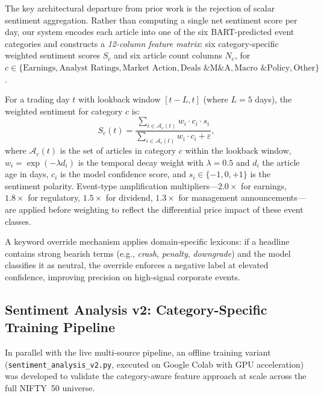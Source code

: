 \documentclass[ASNA,twocolumn]{USG}
\begin{document}
The key architectural departure from prior work is the rejection of scalar
sentiment aggregation. Rather than computing a single net sentiment score per
day, our system encodes each article into one of the six BART-predicted event
categories and constructs a \emph{12-column feature matrix}:
six category-specific weighted sentiment scores $S_c$ and six article count
columns $N_c$, for $c \in \{\text{Earnings}, \text{Analyst Ratings},
\text{Market Action}, \text{Deals \& M\&A}, \text{Macro \& Policy}, \text{Other}\}$.

For a trading day $t$ with lookback window $[t - L, t]$ (where $L = 5$ days),
the weighted sentiment for category $c$ is:
\begin{equation}
  S_c(t) = \frac{\sum_{i \in \mathcal{A}_c(t)} w_i \cdot c_i \cdot s_i}
                {\sum_{i \in \mathcal{A}_c(t)} w_i \cdot c_i + \varepsilon},
  \label{eq:cat_sent}
\end{equation}
where $\mathcal{A}_c(t)$ is the set of articles in category $c$ within the
lookback window, $w_i = \exp(-\lambda d_i)$ is the temporal decay weight
with $\lambda = 0.5$ and $d_i$ the article age in days,
$c_i$ is the model confidence score, and $s_i \in \{-1, 0, +1\}$ is the
sentiment polarity. Event-type amplification multipliers---$2.0\times$ for
earnings, $1.8\times$ for regulatory, $1.5\times$ for dividend, $1.3\times$
for management announcements---are applied before weighting to reflect the
differential price impact of these event classes.

A keyword override mechanism applies domain-specific lexicons:
if a headline contains strong bearish terms
(e.g., \textit{crash}, \textit{penalty}, \textit{downgrade}) and the model
classifies it as neutral, the override enforces a negative label at elevated
confidence, improving precision on high-signal corporate events.

\subsection{Sentiment Analysis v2: Category-Specific Training Pipeline}

In parallel with the live multi-source pipeline, an offline training variant
(\texttt{sentiment\_analysis\_v2.py}, executed on Google Colab with GPU
acceleration) was developed to validate the category-aware feature approach
at scale across the full NIFTY~50 universe.
\end{document}
